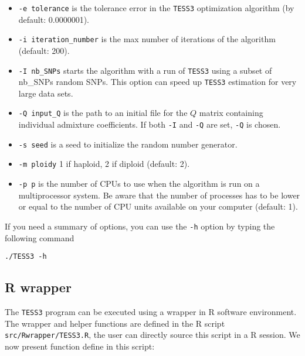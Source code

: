 \documentclass[10pt,a4paper]{article}
\begin{document}
\begin{itemize}
\item \verb|-e tolerance| is the tolerance error in the {\tt TESS3} optimization algorithm (by default: 0.0000001). 
\item \verb|-i iteration_number| is the max number of iterations of the algorithm (default: 200). 
\item \verb|-I nb_SNPs| starts the algorithm with a run of {\tt TESS3} using a subset of nb\_SNPs random SNPs. This option can speed up {\tt TESS3} estimation for very large data sets.
\item \verb|-Q input_Q| is the path to an initial file for the $Q$ matrix containing individual admixture coefficients. If both \verb|-I| and \verb|-Q| are set, \verb|-Q| is chosen.
\item \verb|-s seed| is a seed to initialize the random number generator. 
\item \verb|-m ploidy|  1 if haploid, 2 if diploid (default: 2). 
\item \verb|-p p| is the number of CPUs to use when the algorithm is run on a multiprocessor system.
Be aware that the number of processes has to be lower or equal to the number 
of CPU units available on your computer (default: 1).

\end{itemize}


\noindent
If you need a summary of options, you can use the \verb|-h| option by typing the following command
\footnotesize
\begin{Verbatim}[frame=single]
./TESS3 -h
\end{Verbatim}
\noindent
\normalsize

\subsection{R wrapper}
The {\tt TESS3} program can be executed using a wrapper in R software environment. The wrapper and helper functions are defined in the R script \verb|src/Rwrapper/TESS3.R|, the user can directly source this script in a R session. We now present function define in this script: 
\end{document}
